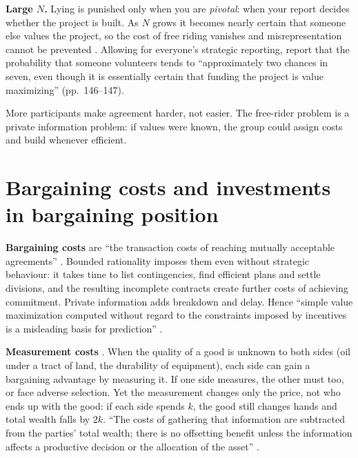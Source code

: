 \textbf{Large $N$.} Lying is punished only when you are \emph{pivotal}: when your report decides
whether the project is built. As $N$ grows it becomes nearly certain that someone else values the
project, so the cost of free riding vanishes and misrepresentation cannot be prevented
. Allowing for everyone's strategic reporting, \MR{} report that the probability that
someone volunteers tends to ``approximately two chances in seven, even though it is essentially
certain that funding the project is value maximizing'' (pp.~146--147).

\begin{keyidea}
More participants make agreement harder, not easier. The free-rider problem is a private
information problem: if values were known, the group could assign costs and build whenever
efficient.
\end{keyidea}

\section{Bargaining costs and investments in bargaining position}\label{sec:b-costs}

\textbf{Bargaining costs} are ``the transaction costs of reaching mutually acceptable
agreements'' . Bounded rationality imposes them even without strategic behaviour: it takes
time to list contingencies, find efficient plans and settle divisions, and the resulting
incomplete contracts create further costs of achieving commitment. Private information adds
breakdown and delay. Hence ``simple value maximization computed without regard to the
constraints imposed by incentives is a misleading basis for prediction'' .

\textbf{Measurement costs} . When the quality of a good is unknown to both sides
(oil under a tract of land, the durability of equipment), each side can gain a bargaining
advantage by measuring it. If one side measures, the other must too, or face adverse selection.
Yet the measurement changes only the price, not who ends up with the good: if each side spends
$k$, the good still changes hands and total wealth falls by $2k$. ``The costs of gathering that
information are subtracted from the parties' total wealth; there is no offsetting benefit unless
the information affects a productive decision or the allocation of the asset'' .

